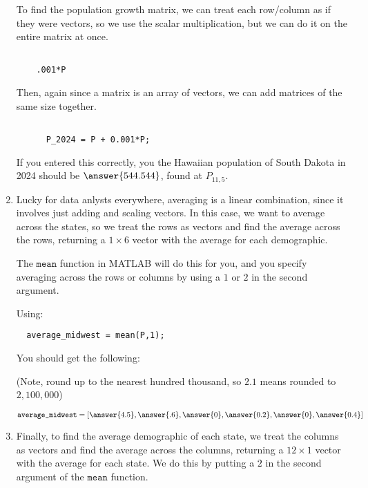 \documentclass{ximera}
\begin{document}
\begin{exploration}
\begin{example}
\begin{solution}
\begin{enumerate}
  To find the population growth matrix, we can treat each row/column as if they were vectors, so we use the scalar multiplication, but we can do it on the entire matrix at once. 

  \begin{verbatim}
  
    .001*P

  \end{verbatim}

  Then, again since a matrix is an array of vectors, we can add matrices of the same size together.

    \begin{Verbatim}

      P_2024 = P + 0.001*P;

    \end{Verbatim}

    If you entered this correctly, you the Hawaiian population of South Dakota in 2024 should be $\answer{544.544}$, found at $P_{11,5}$.

\item Lucky for data anlysts everywhere, averaging is a linear combination, since it involves just adding and scaling vectors. In this case, we want to average across the states, so we treat the rows as vectors and find the average across the rows, returning a $1\times 6$ vector with the average for each demographic. 

The $\texttt{mean}$ function in MATLAB will do this for you, and you specify averaging across the rows or columns by using a $1$ or $2$ in the second argument. 

Using: 

\begin{verbatim}
  average_midwest = mean(P,1);
\end{verbatim}

You should get the following:

(Note, round up to the nearest hundred thousand, so $2.1$ means rounded to $2,100,000$)

\[
\texttt{average\_midwest} = [\answer{4.5},\answer{.6},\answer{0},\answer{0.2},\answer{0},\answer{0.4}]
\]

\item Finally, to find the average demographic of each state, we treat the columns as vectors and find the average across the columns, returning a $12\times 1$ vector with the average for each state. We do this by putting a $2$ in the second argument of the $\texttt{mean}$ function.


\end{enumerate}
\end{solution}
\end{example}
\end{exploration}
\end{document}
